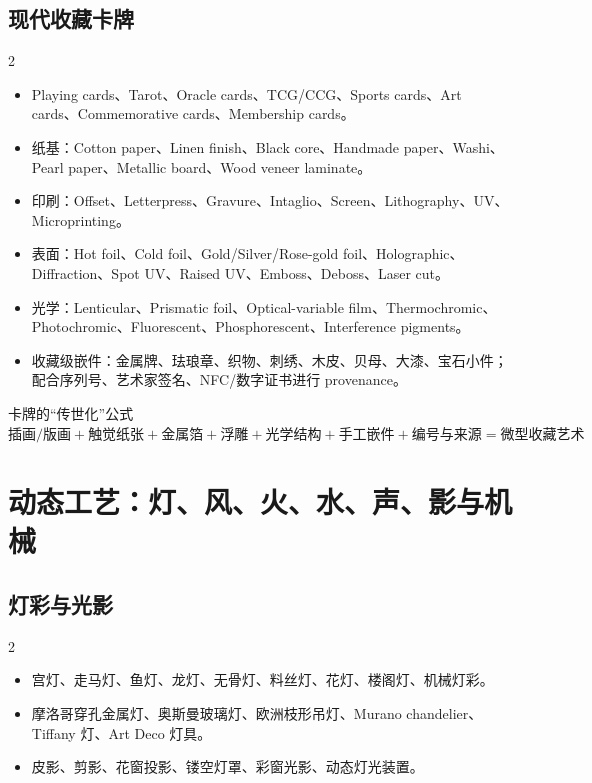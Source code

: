 \documentclass[lang=en,a4paper,11pt]{elegantpaper}
\begin{document}
\subsection{现代收藏卡牌}


\begin{multicols}{2}
\begin{itemize}
\item Playing cards、Tarot、Oracle cards、TCG/CCG、Sports cards、Art cards、Commemorative cards、Membership cards。
\item 纸基：Cotton paper、Linen finish、Black core、Handmade paper、Washi、Pearl paper、Metallic board、Wood veneer laminate。
\item 印刷：Offset、Letterpress、Gravure、Intaglio、Screen、Lithography、UV、Microprinting。
\item 表面：Hot foil、Cold foil、Gold/Silver/Rose-gold foil、Holographic、Diffraction、Spot UV、Raised UV、Emboss、Deboss、Laser cut。
\item 光学：Lenticular、Prismatic foil、Optical-variable film、Thermochromic、Photochromic、Fluorescent、Phosphorescent、Interference pigments。
\item 收藏级嵌件：金属牌、珐琅章、织物、刺绣、木皮、贝母、大漆、宝石小件；配合序列号、艺术家签名、NFC/数字证书进行 provenance。
\end{itemize}
\end{multicols}

\begin{designbox}{卡牌的“传世化”公式}
\centering
$\text{插画/版画}+\text{触觉纸张}+\text{金属箔}+\text{浮雕}+\text{光学结构}+\text{手工嵌件}+\text{编号与来源}=\text{微型收藏艺术}$
\end{designbox}

\section{动态工艺：灯、风、火、水、声、影与机械}


\subsection{灯彩与光影}


\begin{multicols}{2}
\begin{itemize}
\item 宫灯、走马灯、鱼灯、龙灯、无骨灯、料丝灯、花灯、楼阁灯、机械灯彩。
\item 摩洛哥穿孔金属灯、奥斯曼玻璃灯、欧洲枝形吊灯、Murano chandelier、Tiffany 灯、Art Deco 灯具。
\item 皮影、剪影、花窗投影、镂空灯罩、彩窗光影、动态灯光装置。
\end{itemize}
\end{multicols}
\end{document}

